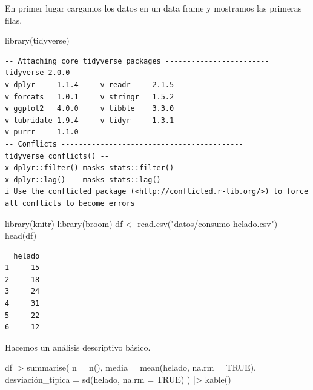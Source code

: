 \documentclass[
  spanish,
  a4paper,
]{scrreport}
\newenvironment{Shaded}{\begin{snugshade}}{\end{snugshade}}
\newcommand{\AttributeTok}[1]{\textcolor[rgb]{0.40,0.45,0.13}{#1}}
\newcommand{\ConstantTok}[1]{\textcolor[rgb]{0.56,0.35,0.01}{#1}}
\newcommand{\FunctionTok}[1]{\textcolor[rgb]{0.28,0.35,0.67}{#1}}
\newcommand{\NormalTok}[1]{\textcolor[rgb]{0.00,0.23,0.31}{#1}}
\newcommand{\OtherTok}[1]{\textcolor[rgb]{0.00,0.23,0.31}{#1}}
\newcommand{\SpecialCharTok}[1]{\textcolor[rgb]{0.37,0.37,0.37}{#1}}
\newcommand{\StringTok}[1]{\textcolor[rgb]{0.13,0.47,0.30}{#1}}
\theoremstyle{definition}
\theoremstyle{remark}
\begin{document}
\begin{tcolorbox}[enhanced jigsaw, arc=.35mm, bottomrule=.15mm, bottomtitle=1mm, breakable, colback=white, colbacktitle=quarto-callout-tip-color!10!white, colframe=quarto-callout-tip-color-frame, coltitle=black, left=2mm, leftrule=.75mm, opacityback=0, opacitybacktitle=0.6, rightrule=.15mm, title=\textcolor{quarto-callout-tip-color}{\faLightbulb}\hspace{0.5em}{Solución}, titlerule=0mm, toprule=.15mm, toptitle=1mm]

En primer lugar cargamos los datos en un data frame y mostramos las
primeras filas.

\begin{Shaded}
\begin{Highlighting}[]
\FunctionTok{library}\NormalTok{(tidyverse)}
\end{Highlighting}
\end{Shaded}

\begin{verbatim}
-- Attaching core tidyverse packages ------------------------ tidyverse 2.0.0 --
v dplyr     1.1.4     v readr     2.1.5
v forcats   1.0.1     v stringr   1.5.2
v ggplot2   4.0.0     v tibble    3.3.0
v lubridate 1.9.4     v tidyr     1.3.1
v purrr     1.1.0     
-- Conflicts ------------------------------------------ tidyverse_conflicts() --
x dplyr::filter() masks stats::filter()
x dplyr::lag()    masks stats::lag()
i Use the conflicted package (<http://conflicted.r-lib.org/>) to force all conflicts to become errors
\end{verbatim}

\begin{Shaded}
\begin{Highlighting}[]
\FunctionTok{library}\NormalTok{(knitr)}
\FunctionTok{library}\NormalTok{(broom)}
\NormalTok{df }\OtherTok{\textless{}{-}} \FunctionTok{read.csv}\NormalTok{(}\StringTok{"datos/consumo{-}helado.csv"}\NormalTok{)}
\FunctionTok{head}\NormalTok{(df)}
\end{Highlighting}
\end{Shaded}

\begin{verbatim}
  helado
1     15
2     18
3     24
4     31
5     22
6     12
\end{verbatim}

Hacemos un análisis descriptivo básico.

\begin{Shaded}
\begin{Highlighting}[]
\NormalTok{df }\SpecialCharTok{|\textgreater{}} 
    \FunctionTok{summarise}\NormalTok{(}
        \AttributeTok{n =} \FunctionTok{n}\NormalTok{(),}
        \AttributeTok{media =} \FunctionTok{mean}\NormalTok{(helado, }\AttributeTok{na.rm =} \ConstantTok{TRUE}\NormalTok{),}
\NormalTok{        desviación\_típica }\OtherTok{=} \FunctionTok{sd}\NormalTok{(helado, }\AttributeTok{na.rm =} \ConstantTok{TRUE}\NormalTok{)}
\NormalTok{    ) }\SpecialCharTok{|\textgreater{}} 
    \FunctionTok{kable}\NormalTok{()}
\end{Highlighting}
\end{Shaded}


\end{tcolorbox}
\end{document}

